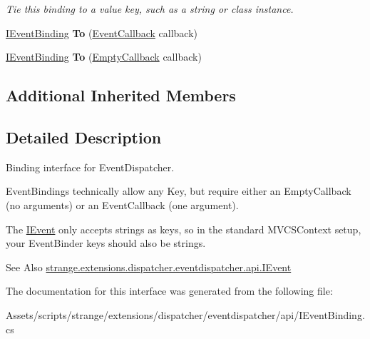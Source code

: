 \begin{DoxyCompactItemize}
\begin{DoxyCompactList}\small\item\em Tie this binding to a value key, such as a string or class instance. \end{DoxyCompactList}\item 
\hypertarget{interfacestrange_1_1extensions_1_1dispatcher_1_1eventdispatcher_1_1api_1_1_i_event_binding_aa3ea162300b1c274476c5f89c3ddbecb}{\hyperlink{interfacestrange_1_1extensions_1_1dispatcher_1_1eventdispatcher_1_1api_1_1_i_event_binding}{I\-Event\-Binding} {\bfseries To} (\hyperlink{namespacestrange_1_1extensions_1_1dispatcher_1_1eventdispatcher_1_1api_a936e11bc9a4f26a96ede9941cc730e72}{Event\-Callback} callback)}\label{interfacestrange_1_1extensions_1_1dispatcher_1_1eventdispatcher_1_1api_1_1_i_event_binding_aa3ea162300b1c274476c5f89c3ddbecb}

\item 
\hypertarget{interfacestrange_1_1extensions_1_1dispatcher_1_1eventdispatcher_1_1api_1_1_i_event_binding_a57463800a377374ccab15f11e0500457}{\hyperlink{interfacestrange_1_1extensions_1_1dispatcher_1_1eventdispatcher_1_1api_1_1_i_event_binding}{I\-Event\-Binding} {\bfseries To} (\hyperlink{namespacestrange_1_1extensions_1_1dispatcher_1_1eventdispatcher_1_1api_a4d68e68b31e6e0f733bd72ddcd6111fa}{Empty\-Callback} callback)}\label{interfacestrange_1_1extensions_1_1dispatcher_1_1eventdispatcher_1_1api_1_1_i_event_binding_a57463800a377374ccab15f11e0500457}

\end{DoxyCompactItemize}
\subsection*{Additional Inherited Members}


\subsection{Detailed Description}
Binding interface for Event\-Dispatcher. 

Event\-Bindings technically allow any Key, but require either an Empty\-Callback (no arguments) or an Event\-Callback (one argument).

The \hyperlink{interfacestrange_1_1extensions_1_1dispatcher_1_1eventdispatcher_1_1api_1_1_i_event}{I\-Event} only accepts strings as keys, so in the standard M\-V\-C\-S\-Context setup, your Event\-Binder keys should also be strings.

\begin{DoxySeeAlso}{See Also}
\hyperlink{interfacestrange_1_1extensions_1_1dispatcher_1_1eventdispatcher_1_1api_1_1_i_event}{strange.\-extensions.\-dispatcher.\-eventdispatcher.\-api.\-I\-Event} 
\end{DoxySeeAlso}


The documentation for this interface was generated from the following file\-:\begin{DoxyCompactItemize}
\item 
Assets/scripts/strange/extensions/dispatcher/eventdispatcher/api/I\-Event\-Binding.\-cs\end{DoxyCompactItemize}
